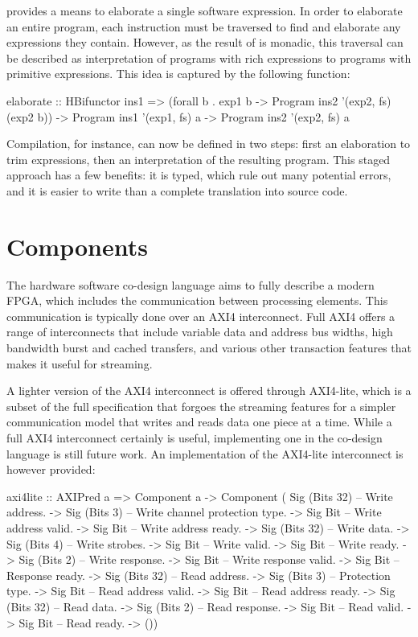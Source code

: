 \documentclass[../paper.tex]{subfiles}
\begin{document}
 provides a means to elaborate a single software expression. In order to elaborate an entire program, each instruction must be traversed to find and elaborate any expressions they contain. However, as the result of  is monadic, this traversal can be described as interpretation of programs with rich expressions to programs with primitive expressions. This idea is captured by the following function:

\begin{code}
elaborate :: HBifunctor ins1
    => (forall b . exp1 b -> Program ins2 '(exp2, fs) (exp2 b))
    -> Program ins1 '(exp1, fs) a -> Program ins2 '(exp2, fs) a
\end{code}

\noindent Compilation, for instance, can now be defined in two steps: first an elaboration to trim expressions, then an interpretation of the resulting program. This staged approach has a few benefits: it is typed, which rule out many potential errors, and it is easier to write than a complete translation into source code.

\section{Components}

The hardware software co-design language aims to fully describe a modern FPGA, which includes the communication between processing elements. This communication is typically done over an AXI4 interconnect. Full AXI4 offers a range of interconnects that include variable data and address bus widths, high bandwidth burst and cached transfers, and various other transaction features that makes it useful for streaming.

A lighter version of the AXI4 interconnect is offered through AXI4-lite, which is a subset of the full specification that forgoes the streaming features for a simpler communication model that writes and reads data one piece at a time. While a full AXI4 interconnect certainly is useful, implementing one in the co-design language is still future work. An implementation of the AXI4-lite interconnect is however provided:

\begin{code}
axi4lite :: AXIPred a
  => Component a
  -> Component (
          Sig (Bits 32) -- Write address.
       -> Sig (Bits 3)  -- Write channel protection type.
       -> Sig Bit       -- Write address valid.
       -> Sig Bit       -- Write address ready.
       -> Sig (Bits 32) -- Write data.
       -> Sig (Bits 4)  -- Write strobes.
       -> Sig Bit       -- Write valid.
       -> Sig Bit       -- Write ready.
       -> Sig (Bits 2)  -- Write response.
       -> Sig Bit       -- Write response valid.
       -> Sig Bit       -- Response ready.
       -> Sig (Bits 32) -- Read address.
       -> Sig (Bits 3)  -- Protection type.
       -> Sig Bit       -- Read address valid.
       -> Sig Bit       -- Read address ready.
       -> Sig (Bits 32) -- Read data.
       -> Sig (Bits 2)  -- Read response.
       -> Sig Bit       -- Read valid.
       -> Sig Bit       -- Read ready.    
       -> ())
\end{code}
\end{document}
